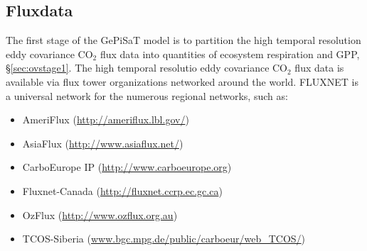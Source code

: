 \subsection{Fluxdata}
\label{sec:gepfluxd}
The first stage of the GePiSaT model is to partition the high temporal resolution eddy covariance CO$_2$ flux data into quantities of ecosystem respiration and GPP, \S \ref{sec:ovstage1}.  
The high temporal resolutio eddy covariance CO$_2$ flux data is available via flux tower organizations networked around the world.  
FLUXNET\footnotemark {} is a universal network for the numerous regional networks, such as:

\begin{itemize} \itemsep1pt
    \item AmeriFlux (\url{http://ameriflux.lbl.gov/})
    \item AsiaFlux (\url{http://www.asiaflux.net/})
    \item CarboEurope IP (\url{http://www.carboeurope.org})
    \item Fluxnet-Canada (\url{http://fluxnet.ccrp.ec.gc.ca})
    \item OzFlux (\url{http://www.ozflux.org.au})
    \item TCOS-Siberia (\url{www.bgc.mpg.de/public/carboeur/web_TCOS/})
\end{itemize}

